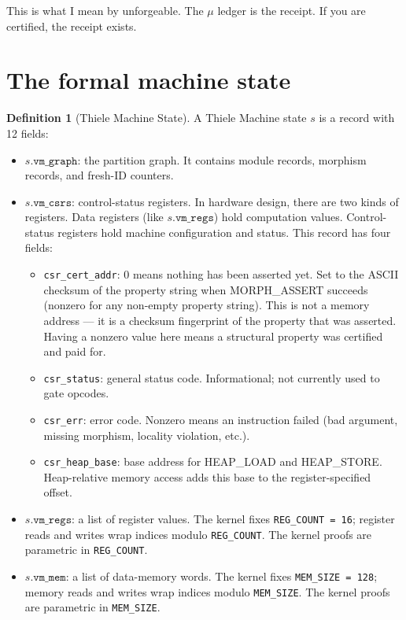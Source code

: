 \documentclass[11pt,a4paper]{article}
\theoremstyle{plain}
\theoremstyle{definition}
\newtheorem{definition}{Definition}[section]
\theoremstyle{remark}
\begin{document}
This is what I mean by unforgeable. The $\mu$ ledger is the receipt. If you are certified, the receipt exists.

\section{The formal machine state}
\label{sec:formal}

\begin{definition}[Thiele Machine State]
A Thiele Machine state $s$ is a record with 12 fields:
\begin{itemize}
\item $s.\texttt{vm\_graph}$: the partition graph. It contains module records, morphism records, and fresh-ID counters.
\item $s.\texttt{vm\_csrs}$: control-status registers. In hardware design, there are two kinds of registers. Data registers (like $s.\texttt{vm\_regs}$) hold computation values. Control-status registers hold machine configuration and status. This record has four fields:
  \begin{itemize}
  \item \texttt{csr\_cert\_addr}: 0 means nothing has been asserted yet. Set to the ASCII checksum of the property string when MORPH\_ASSERT succeeds (nonzero for any non-empty property string). This is not a memory address --- it is a checksum fingerprint of the property that was asserted. Having a nonzero value here means a structural property was certified and paid for.
  \item \texttt{csr\_status}: general status code. Informational; not currently used to gate opcodes.
  \item \texttt{csr\_err}: error code. Nonzero means an instruction failed (bad argument, missing morphism, locality violation, etc.).
  \item \texttt{csr\_heap\_base}: base address for HEAP\_LOAD and HEAP\_STORE. Heap-relative memory access adds this base to the register-specified offset.
  \end{itemize}
\item $s.\texttt{vm\_regs}$: a list of register values. The kernel fixes \texttt{REG\_COUNT = 16}; register reads and writes wrap indices modulo \texttt{REG\_COUNT}. The kernel proofs are parametric in \texttt{REG\_COUNT}.
\item $s.\texttt{vm\_mem}$: a list of data-memory words. The kernel fixes \texttt{MEM\_SIZE = 128}; memory reads and writes wrap indices modulo \texttt{MEM\_SIZE}. The kernel proofs are parametric in \texttt{MEM\_SIZE}.

\end{itemize}
\end{definition}
\end{document}
